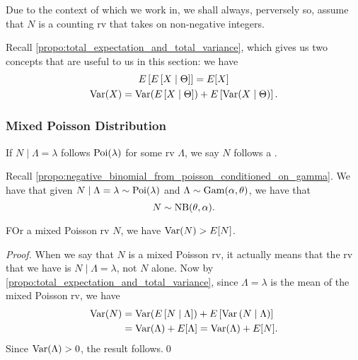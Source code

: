 \documentclass[notoc,notitlepage]{tufte-book}
\begin{document}
\begin{remark}
  Due to the context of which we work in, we shall always, perversely so, assume that $N$ is a counting rv that takes on non-negative integers.
\end{remark}

\begin{note}
  Recall \cref{propo:total_expectation_and_total_variance}, which gives us two concepts that are useful to us in this section: we have
  \begin{gather*}
    E \left[ E \left[ X \mid \Theta \right] \right] = E [ X ] \\
    \operatorname{Var}(X) = \operatorname{Var}( E \left[ X \mid \Theta \right] ) + E \left[ \operatorname{Var}(X \mid \Theta) \right].
  \end{gather*}
\end{note}

\subsubsection{Mixed Poisson Distribution}%
\label{ssub:mixed_poisson_distribution}

\begin{defn}\label{defn:mixed_poisson_distribution}
  If $N \mid \Lambda = \lambda$ follows $\operatorname{Poi}(\lambda)$ for some rv $\Lambda$, we say $N$ follows a .
\end{defn}

\begin{eg}
  Recall \cref{propo:negative_binomial_from_poisson_conditioned_on_gamma}. We have that given $N \mid \Lambda = \lambda \sim \operatorname{Poi}(\lambda)$ and $\Lambda \sim \operatorname{Gam}(\alpha, \theta)$, we have that
  \begin{equation*}
    N \sim \operatorname{NB}(\theta, \alpha).
  \end{equation*}
\end{eg}

\begin{propo}\label{propo:mixed_poisson_distribution_has_a_variance_greater_than_its_mean}
  FOr a mixed Poisson rv $N$, we have $\operatorname{Var}(N) > E[N]$.
\end{propo}

\begin{proof}
  When we say that $N$ is a mixed Poisson rv, it actually means that the rv that we have is $N \mid \Lambda = \lambda$, not $N$ alone. Now by \cref{propo:total_expectation_and_total_variance}, since $\Lambda = \lambda$ is the mean of the mixed Poisson rv, we have
  \begin{align*}
    \operatorname{Var}(N) &= \operatorname{Var}( E \left[ N \mid \Lambda \right] ) + E \left[ \operatorname{Var} \left( N \mid \Lambda \right) \right] \\
            &= \operatorname{Var}( \Lambda ) + E [ \Lambda ] = \operatorname{Var}(\Lambda) + E[ N ].
  \end{align*}
  Since $\operatorname{Var}(\Lambda) > 0$, the result follows.\qed\
\end{proof}
\end{document}
